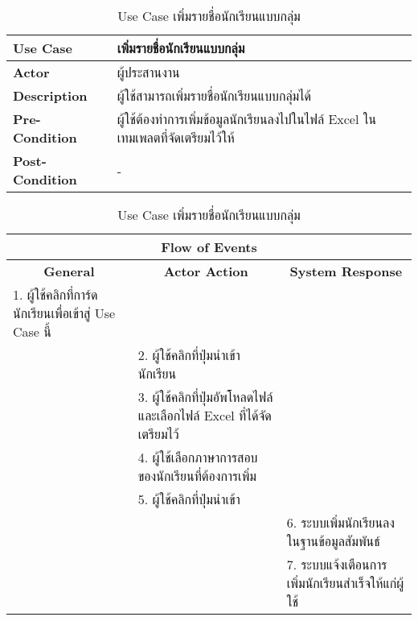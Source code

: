 \begin{table}[H]
    \caption{Use Case เพิ่มรายชื่อนักเรียนแบบกลุ่ม}
    \label{tab:usecase-create-batch-student}
    \begin{tabularx}{\textwidth}{ | p{3cm} | X | }
    \hline
    \textbf{Use Case} & เพิ่มรายชื่อนักเรียนแบบกลุ่ม \\
    \hline
    \textbf{Actor} & ผู้ประสานงาน \\
    \hline
    \textbf{Description} & ผู้ใช้สามารถเพิ่มรายชื่อนักเรียนแบบกลุ่มได้ \\
    \hline
    \textbf{Pre-Condition} & ผู้ใช้ต้องทำการเพิ่มข้อมูลนักเรียนลงไปในไฟล์ Excel ในเทมเพลตที่จัดเตรียมไว้ให้ \\
    \hline
    \textbf{Post-Condition} & - \\
    \hline
    \end{tabularx}
    \begin{tabularx}{\textwidth}{ | X | X | X | }
    \multicolumn{3}{|c|}{\textbf{Flow of Events}} \\
    \hline
    \multicolumn{1}{|c|}{\textbf{General}} & \multicolumn{1}{|c|}{\textbf{Actor Action}} & \multicolumn{1}{|c|}{\textbf{System Response}} \\
    \hline
    1. ผู้ใช้คลิกที่การ์ดนักเรียนเพื่อเข้าสู่ Use Case นี้ & & \\
    \hline
    & 2. ผู้ใช้คลิกที่ปุ่มนำเข้านักเรียน & \\
    \hline
    & 3. ผู้ใช้คลิกที่ปุ่มอัพโหลดไฟล์ และเลือกไฟล์ Excel ที่ได้จัดเตรียมไว้ & \\
    \hline
    & 4. ผู้ใช้เลือกภาษาการสอบของนักเรียนที่ต้องการเพิ่ม & \\
    \hline
    & 5. ผู้ใช้คลิกที่ปุ่มนำเข้า & \\
    \hline
    & & 6. ระบบเพิ่มนักเรียนลงในฐานข้อมูลสัมพันธ์ \\
    \hline
    & & 7. ระบบแจ้งเตือนการเพิ่มนักเรียนสำเร็จให้แก่ผู้ใช้ \\
    \hline
    \end{tabularx}
\end{table}
